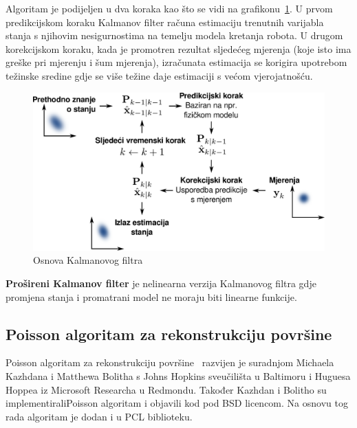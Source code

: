 Algoritam je podijeljen u dva koraka kao što se vidi na
grafikonu~\ref{fig:basic-kalman}. U prvom predikcijskom koraku Kalmanov
filter računa estimaciju trenutnih varijabla stanja s njihovim
nesigurnostima na temelju modela kretanja robota. U drugom korekcijskom
koraku, kada je promotren rezultat sljedećeg mjerenja (koje isto ima
greške pri mjerenju i šum mjerenja), izračunata estimacija se korigira
upotrebom težinske sredine gdje se više težine daje estimaciji s većom
vjerojatnošću.

\begin{figure}[h]
\centering
\renewcommand{\figurename}{Grafikon}
\includegraphics[scale=0.35]{figures/basic-kalman.pdf}
\caption{Osnova Kalmanovog filtra}
\label{fig:basic-kalman}
\end{figure}

\textbf{Prošireni Kalmanov filter} je nelinearna verzija Kalmanovog
filtra gdje promjena stanja i promatrani model ne moraju biti linearne
funkcije.



\newpage
\subsection{Poisson algoritam za rekonstrukciju površine} %
\label{sub:Poisson}
Poisson algoritam za rekonstrukciju površine~\cite{Kazhdan:2006}
razvijen je suradnjom Michaela Kazhdana i Matthewa Bolitha s Johns
Hopkins sveučilišta u Baltimoru i Huguesa Hoppea iz Microsoft Researcha
u Redmondu. Također Kazhdan i Bolitho su implementirali\footnotemark[1]
Poisson algoritam i objavili kod pod BSD licencom. Na osnovu tog rada
algoritam je dodan i u PCL biblioteku.

